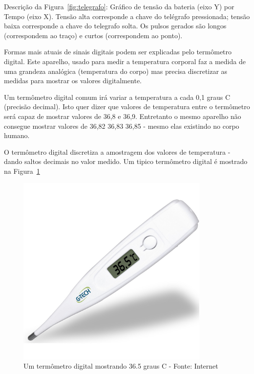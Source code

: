 Descrição da Figura~\ref{fig:telegrafo}: Gráfico de tensão da bateria (eixo Y) por Tempo (eixo X). Tensão alta corresponde a chave do telégrafo pressionada; tensão baixa corresponde a chave do telegrafo solta. Os pulsos gerados são longos (correspondem ao traço) e curtos (correspondem ao ponto).

Formas mais atuais de sinais digitais podem ser explicadas pelo termômetro digital. Este aparelho, usado para medir a temperatura corporal faz a medida de uma grandeza analógica (temperatura do corpo) mas precisa discretizar as medidas para mostrar os valores digitalmente. 

Um termômetro digital comum irá variar a temperatura a cada 0,1 graus C (precisão decimal). Isto quer dizer que valores de temperatura entre o termômetro será capaz de mostrar valores de 36,8 e 36,9. Entretanto o mesmo aparelho não consegue mostrar valores de 36,82 36,83 36,85 - mesmo elas existindo no corpo humano.

O termômetro digital discretiza a amostragem dos valores de temperatura - dando saltos decimais no valor medido. Um tipico termômetro digital é mostrado na Figura~\ref{fig:termometro}

\begin{figure}[h]
	\begin{center}
		\includegraphics[width=0.85\textwidth]{img/sinais/termometroDigital.png}
		\caption{Um termômetro digital mostrando 36.5 graus C - Fonte: Internet}
		\label{fig:termometro}
	\end{center}
\end{figure}

